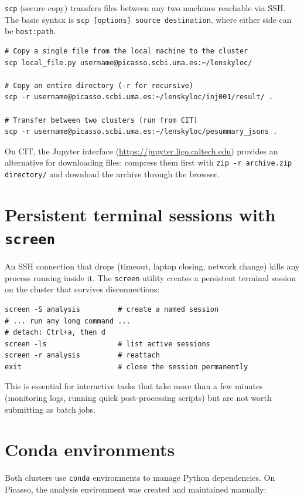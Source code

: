 \texttt{scp} (secure copy) transfers files between any two machines reachable via SSH. The basic syntax is \texttt{scp [options] source destination}, where either side can be \texttt{host:path}.

\begin{verbatim}
# Copy a single file from the local machine to the cluster
scp local_file.py username@picasso.scbi.uma.es:~/lenskyloc/

# Copy an entire directory (-r for recursive)
scp -r username@picasso.scbi.uma.es:~/lenskyloc/inj001/result/ .

# Transfer between two clusters (run from CIT)
scp -r username@picasso.scbi.uma.es:~/lenskyloc/pesummary_jsons .
\end{verbatim}

On CIT, the Jupyter interface (\url{https://jupyter.ligo.caltech.edu}) provides an alternative for downloading files: compress them first with \texttt{zip -r archive.zip directory/} and download the archive through the browser.

\section{Persistent terminal sessions with \texttt{screen}}

An SSH connection that drops (timeout, laptop closing, network change) kills any process running inside it. The \texttt{screen} utility creates a persistent terminal session on the cluster that survives disconnections:

\begin{verbatim}
screen -S analysis         # create a named session
# ... run any long command ...
# detach: Ctrl+a, then d
screen -ls                 # list active sessions
screen -r analysis         # reattach
exit                       # close the session permanently
\end{verbatim}

This is essential for interactive tasks that take more than a few minutes (monitoring logs, running quick post-processing scripts) but are not worth submitting as batch jobs.

\section{Conda environments}

Both clusters use \texttt{conda} environments to manage Python dependencies. On Picasso, the analysis environment was created and maintained manually:

